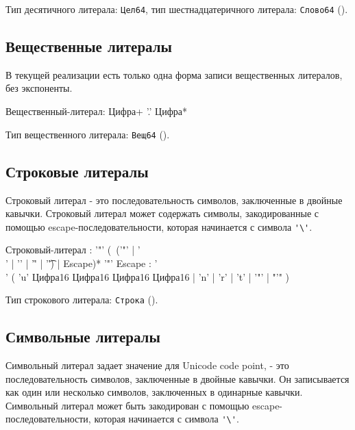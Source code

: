 Тип десятичного литерала: \verb+Цел64+, тип шестнадцатеричного литерала: \verb+Слово64+ (). 

\hypertarget{floatlit}{%
\subsection{Вещественные литералы}\label{lex:floatlit}}

В текущей реализации есть только одна форма записи вещественных литералов, без экспоненты.

\begin{Grammar}
Вещественный-литерал: Цифра+ '.' Цифра*
\end{Grammar}      

Тип вещественного литерала: \verb+Вещ64+ (). 

\hypertarget{strlit}{%
\subsection{Строковые литералы}\label{lex:strlit}}

Строковый литерал - это последовательность символов, заключенные в двойные кавычки. Строковый литерал может содержать символы, закодированные с помощью escape-последовательности, которая начинается с символа \verb+'\'+.

\begin{Grammar}
Строковый-литерал
    : '"'
    (~('"' | '\\' | '\n' | '\r' | '\t') | Escape)* 
    '"' 
Escape
    : '\\'
    ( 'u' Цифра16 Цифра16 Цифра16 Цифра16
    | 'n' | 'r' | 't' 
    | '"'
    | "'"
    )
\end{Grammar}  

Тип строкового литерала: \verb+Строка+ (). 

\hypertarget{symlit}{%
\subsection{Символьные литералы}\label{lex:symlit}}

Символьный литерал задает значение для Unicode code point, - это последовательность символов, заключенные в двойные кавычки.
Он записывается как один или несколько символов, заключенных в одинарные кавычки. Символьный литерал может быть закодирован с помощью escape-последовательности, которая начинается с символа \verb+'\'+.

